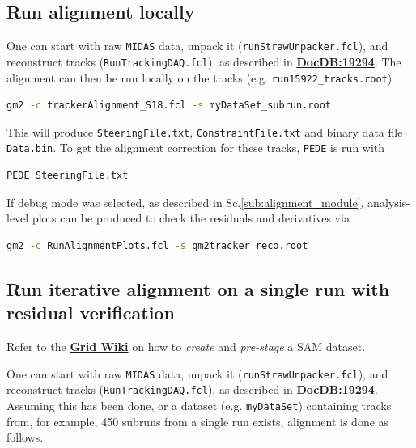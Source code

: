 \documentclass[12pt]{article}
\begin{document}
\subsection{Run alignment locally}
One can start with raw \texttt{MIDAS} data, unpack it (\verb!runStrawUnpacker.fcl!), and reconstruct tracks (\verb!RunTrackingDAQ.fcl!), as described in \textbf{\href{https://gm2-docdb.fnal.gov/cgi-bin/private/ShowDocument?docid=19294}{DocDB:19294}}. The alignment can then be run locally on the tracks (e.g. \verb!run15922_tracks.root!)
\begin{lstlisting}[language=bash] 
     gm2 -c trackerAlignment_S18.fcl -s myDataSet_subrun.root \end{lstlisting}
This will produce \verb!SteeringFile.txt!, \verb!ConstraintFile.txt! and binary data file \verb!Data.bin!. To get the alignment correction for these tracks, \verb!PEDE! is run with
\begin{lstlisting}[language=bash] 
     PEDE SteeringFile.txt \end{lstlisting}
If debug mode was selected, as described in Sc.\ref{sub:alignment_module}, analysis-level plots can be produced to check the residuals and derivatives via
\begin{lstlisting}[language=bash] 
    gm2 -c RunAlignmentPlots.fcl -s gm2tracker_reco.root\end{lstlisting}

\subsection{Run iterative alignment on a single run with residual verification}\label{sub:run_iterative}
Refer to the \textbf{\href{https://redmine.fnal.gov/redmine/projects/g-2/wiki/Job_Running_Submission_FAQ}{Grid Wiki}} on how to \textit{create} and \textit{pre-stage} a SAM dataset. 

One can start with raw \texttt{MIDAS} data, unpack it (\verb!runStrawUnpacker.fcl!), and reconstruct tracks (\verb!RunTrackingDAQ.fcl!), as described in \textbf{\href{https://gm2-docdb.fnal.gov/cgi-bin/private/ShowDocument?docid=19294}{DocDB:19294}}. Assuming this has been done, or a dataset (e.g. \texttt{myDataSet}) containing tracks from, for example, 450 subruns from a single run exists, alignment is done as follows.
\end{document}
